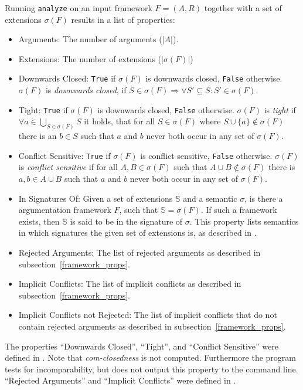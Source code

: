\documentclass[parskip=half]{scrartcl}
\begin{document}
Running \texttt{analyze} on an input framework $F=(A,R)$ together with a set of
extensions $\sigma(F)$ results in a list of properties:
\begin{itemize}
  \item Arguments: The number of arguments ($|A|$).
  \item Extensions:	The number of extensions ($|\sigma(F)|$)
  \item Downwards Closed:	\texttt{True} if $\sigma(F)$ is downwards closed,
      \texttt{False} otherwise.  $\sigma(F)$ is \emph{downwards closed}, if $S
      \in \sigma(F)\Rightarrow \forall S'\subseteq S: S'\in\sigma(F)$.
  \item Tight: \texttt{True} if $\sigma(F)$ is downwards closed, \texttt{False}
      otherwise.  $\sigma(F)$ is \emph{tight} if $\forall
      a\in\bigcup_{S\in\sigma(F)}S$ it holds, that for all $S\in\sigma(F)$ where
      $S\cup\{a\}\notin\sigma(F)$ there is an $b\in S$ such that $a$ and $b$
      never both occur in any set of $\sigma(F)$.
  \item Conflict Sensitive: \texttt{True} if $\sigma(F)$ is conflict sensitive,
      \texttt{False} otherwise.  $\sigma(F)$ is \emph{conflict sensitive} if for
      all $A, B\in\sigma(F)$ such that $A\cup B\notin\sigma(F)$ there is $a,
      b\in A\cup B$ such that $a$ and $b$ never both occur in any set of
      $\sigma(F)$.
  \item In Signatures Of: Given a set of extensions $\mathbb{S}$ and a semantic
      $\sigma$, is there a argumentation framework $F$, such that $\mathbb{S} =
      \sigma(F)$. If such a framework exists, then $\mathbb{S}$ is said to be in
      the signature of $\sigma$. This property lists semantics in which
      signatures the given set of extensions is, as described in
      \cite{dunne2015characteristics}.
  \item Rejected Arguments: The list of rejected arguments as described in
      subsection~\ref{framework_props}.
  \item Implicit Conflicts: The list of implicit conflicts as described in
      subsection~\ref{framework_props}.
  \item Implicit Conflicts not Rejected: The list of implicit conflicts that do
      not contain rejected arguments as described in
      subsection~\ref{framework_props}.
\end{itemize}

The properties ``Downwards Closed'', ``Tight'', and ``Conflict Sensitive'' were
defined in \cite{dunne2015characteristics}. Note that \emph{com-closedness} is
not computed. Furthermore the program tests for incomparability, but does not
output this property to the command line.  ``Rejected Arguments'' and ``Implicit
Conflicts'' were defined in \cite{linsbichler2015hidden}.
\end{document}
